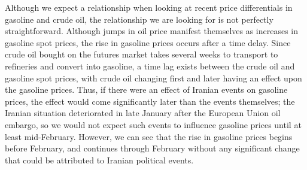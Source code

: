 \documentclass[11pt,twocolumn]{article}
\newcommand{\tab}[0] {\hspace*{24pt}}
\begin{document}
\begin{multicols}{2}
\tab Although we expect a relationship when looking at recent price differentials in gasoline and crude oil, the relationship we are looking for is not perfectly straightforward. Although jumps in oil price manifest themselves as increases in gasoline spot prices, the rise in gasoline prices occurs after a time delay. Since crude oil bought on the futures market takes several weeks to transport to refineries and convert into gasoline, a time lag exists between the crude oil and gasoline spot prices, with crude oil changing first and later having an effect upon the gasoline prices. Thus, if there were an effect of Iranian events on gasoline prices, the effect would come significantly later than the events themselves; the Iranian situation deteriorated in late January after the European Union oil embargo, so we would not expect such events to influence gasoline prices until at least mid-February. However, we can see that the rise in gasoline prices begins before February, and continues through February without any significant change that could be attributed to Iranian political events. 


\end{multicols}
\end{document}
